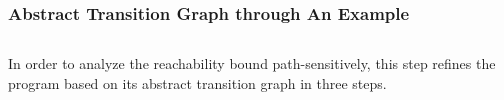 \subsubsection{Abstract Transition Graph through An Example }
\label{sec:abscfg_example}
% 
%

%
\subsection{}
\label{sec:pathsensitive_rb-refine}
In order to analyze the reachability bound path-sensitively, this step refines the program based on its abstract transition graph in three steps.
%
